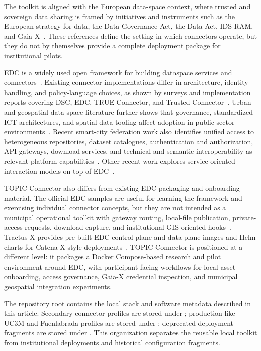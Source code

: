 \documentclass[a4paper,fleqn]{cas-dc}
\newcommand{\code}[1]{\path{#1}}
\begin{document}
The toolkit is aligned with the European data-space context, where trusted and sovereign data sharing is framed by initiatives and instruments such as the European strategy for data, the Data Governance Act, the Data Act, IDS-RAM, and Gaia-X~\cite{b1,b2,b3,b4,b5,b6}. These references define the setting in which connectors operate, but they do not by themselves provide a complete deployment package for institutional pilots.

EDC is a widely used open framework for building dataspace services and connectors~\cite{b7}. Existing connector implementations differ in architecture, identity handling, and policy-language choices, as shown by surveys and implementation reports covering DSC, EDC, TRUE Connector, and Trusted Connector~\cite{b12,b13}. Urban and geospatial data-space literature further shows that governance, standardized ICT architectures, and spatial-data tooling affect adoption in public-sector environments~\cite{b14,b15,b16}. Recent smart-city federation work also identifies unified access to heterogeneous repositories, dataset catalogues, authentication and authorization, API gateways, download services, and technical and semantic interoperability as relevant platform capabilities~\cite{b19}. Other recent work explores service-oriented interaction models on top of EDC~\cite{b17}.

TOPIC Connector also differs from existing EDC packaging and onboarding material. The official EDC samples are useful for learning the framework and exercising individual connector concepts, but they are not intended as a municipal operational toolkit with gateway routing, local-file publication, private-access requests, download capture, and institutional GIS-oriented hooks~\cite{b20}. Tractus-X provides pre-built EDC control-plane and data-plane images and Helm charts for Catena-X-style deployments~\cite{b21}. TOPIC Connector is positioned at a different level: it packages a Docker Compose-based research and pilot environment around EDC, with participant-facing workflows for local asset onboarding, access governance, Gaia-X credential inspection, and municipal geospatial integration experiments.

The repository root contains the local stack and software metadata described in this article. Secondary connector profiles are stored under \code{experimental/}; production-like UC3M and Fuenlabrada profiles are stored under \code{institutional-profiles/}; deprecated deployment fragments are stored under \code{legacy/}. This organization separates the reusable local toolkit from institutional deployments and historical configuration fragments.
\end{document}
